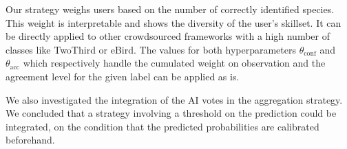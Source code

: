 Our strategy weighs users based on the number of correctly identified species. This weight is interpretable and shows the diversity of the user's skillset.
It can be directly applied to other crowdsourced frameworks with a high number of classes like TwoThird or eBird.
The values for both hyperparameters $\theta_\mathrm{conf}$ and $\theta_\mathrm{acc}$ which respectively handle the cumulated weight on observation and the agreement level for the given label can be applied as is.

We also investigated the integration of the AI votes in the aggregation strategy.
We concluded that a strategy involving a threshold on the prediction could be integrated, on the condition that the predicted probabilities are calibrated beforehand.